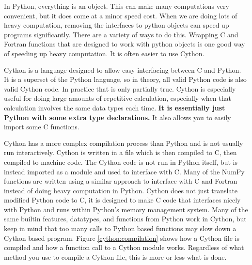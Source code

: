 \label{lab:Cython}


In Python, everything is an object.
This can make many computations very convenient, but it does come at a minor speed cost.
When we are doing lots of heavy computation, removing the interfaces to python objects can speed up programs significantly.
There are a variety of ways to do this.
Wrapping C and Fortran functions that are designed to work with python objects is one good way of speeding up heavy computation.
It is often easier to use Cython.

Cython is a language designed to allow easy interfacing between C and Python.
It is a superset of the Python language, so in theory, all valid Python code is also valid Cython code.
In practice that is only partially true.
Cython is especially useful for doing large amounts of repetitive calculation, especially when that calculation involves the same data types each time.
\textbf{It is essentially just Python with some extra type declarations.}
It also allows you to easily import some C functions.

Cython has a more complex compilation process than Python and is not usually run interactively.
Cython is written in a  file which is then compiled to C, then compiled to machine code.
The Cython code is not run in Python itself, but is instead imported as a module and used to interface with C.
Many of the NumPy functions are written using a similar approach to interface with C and Fortran instead of doing heavy computation in Python.
Cython does not just translate modified Python code to C, it is designed to make C code that interfaces nicely with Python and runs within Python's memory management system.
Many of the same builtin features, datatypes, and functions from Python work in Cython, but keep in mind that too many calls to Python based functions may slow down a Cython based program.
Figure \ref{cython:compilation} shows how a Cython file is compiled and how a function call to a Cython module works.
Regardless of what method you use to compile a Cython file, this is more or less what is done.

